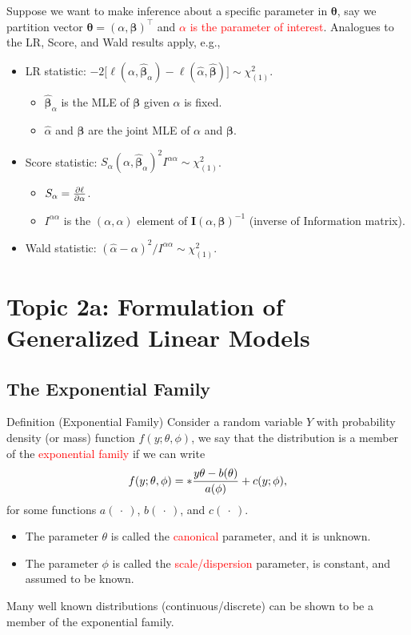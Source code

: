 \documentclass{article}\usepackage[]{graphicx}\usepackage[svgnames]{xcolor}
\let\exp\relax%
\providecommand{\Vector}[1]{\bm{#1}}%
\providecommand{\Matrix}[1]{\bm{#1}}
\begin{document}
Suppose we want to make inference about a specific parameter in $ \Vector{\theta} $, say we
partition vector $ \Vector{\theta}=(\alpha,\Vector{\beta})^\top $ and \textcolor{Red}{$ \alpha $
      is the parameter of interest}. Analogues to the LR, Score, and Wald results apply, e.g.,
\begin{itemize}
      \item LR statistic: $ -2\bigl[\ell(\alpha,\hat{\Vector{\beta}}_{\alpha})-\ell(\hat{\alpha},\hat{\Vector{\beta}})\bigr]\sim \chi^2_{(1)} $.
            \begin{itemize}
                  \item $ \hat{\Vector{\beta}}_{\alpha} $ is the MLE of $ \Vector{\beta} $ given $ \alpha $ is fixed.
                  \item $ \hat{\alpha} $ and $ \hat{\Vector{\beta}} $ are the joint MLE of $ \alpha $ and $ \Vector{\beta} $.
            \end{itemize}
      \item Score statistic: $ S_\alpha(\alpha,\hat{\Vector{\beta}}_\alpha)^2 I^{\alpha\alpha}\sim \chi^2_{(1)} $.
            \begin{itemize}
                  \item $ S_\alpha=\pdv{\ell}{\alpha} $.
                  \item $ I^{\alpha\alpha} $ is the $ (\alpha,\alpha) $ element of $ \Matrix{I}(\alpha,\Vector{\beta})^{-1} $ (inverse of Information matrix).
            \end{itemize}
      \item Wald statistic: $ (\hat{\alpha}-\alpha)^2/I^{\alpha\alpha}\sim \chi^2_{(1)} $.
\end{itemize}

\section*{Topic 2a: Formulation of Generalized Linear Models}
\subsection*{The Exponential Family}
\begin{Regular}{Definition (Exponential Family)}
    Consider a random variable $ Y $ with probability density (or mass) function $ f(y;\theta,\phi) $,
    we say that the distribution is a member of the \textcolor{Red}{exponential family} if we can write
    \[ f(y;\theta,\phi)=\exp*{\frac{y\theta-b(\theta)}{a(\phi)}+c(y;\phi)}, \]
    for some functions $ a(\:\cdot\:) $, $ b(\:\cdot\:) $, and $ c(\:\cdot\:) $.
    \begin{itemize}
        \item The parameter $ \theta $ is called the \textcolor{Red}{canonical} parameter, and it is unknown.
        \item The parameter $ \phi $ is called the \textcolor{Red}{scale/dispersion} parameter, is constant, and assumed to be known.
    \end{itemize}
\end{Regular}
Many well known distributions (continuous/discrete) can be shown to be a
member of the exponential family.
\end{document}
